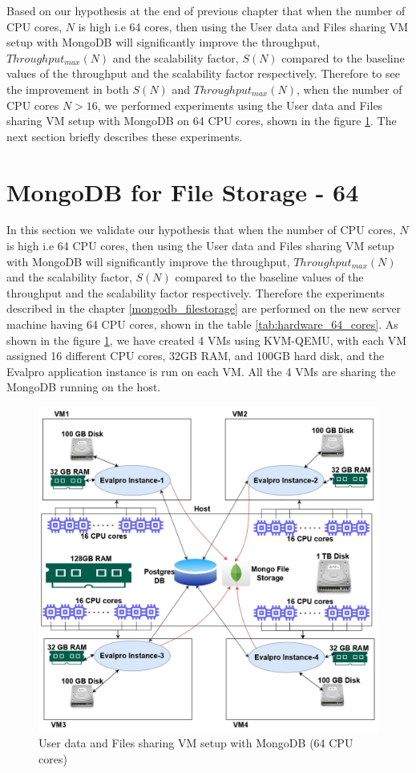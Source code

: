 \documentclass{iitbreport}
\begin{document}
Based on our hypothesis at the end of previous chapter that when the number of CPU cores, $N$ is high i.e 64 cores, then using the User data and Files sharing VM setup with MongoDB will significantly improve the throughput, $Throughput_{max}(N)$ and the scalability factor, $S(N)$ compared to the baseline values of the throughput and the scalability factor respectively. Therefore to see the improvement in both  $S(N)$ and $Throughput_{max}(N)$, when the number of CPU cores $N>16$, we performed experiments using the User data and Files sharing VM setup with MongoDB on 64 CPU cores, shown in the figure \ref{shared_vm_mongo_64_cores}. The next section briefly describes these experiments.

\section{MongoDB for File Storage - 64}\label{mongo_64_cores}
In this section we validate our hypothesis that when the number of CPU cores, $N$ is high i.e 64 CPU cores, then using the User data and Files sharing VM setup with MongoDB will significantly improve the throughput, $Throughput_{max}(N)$ and the scalability factor, $S(N)$ compared to the baseline values of the throughput and the scalability factor respectively. Therefore the experiments described in the chapter \ref{mongodb_filestorage} are performed on the new server machine having 64 CPU cores, shown in the table \ref{tab:hardware_64_cores}. As shown in the figure \ref{shared_vm_mongo_64_cores},  we have created 4 VMs using KVM-QEMU, with each VM assigned 16 different CPU cores, 32GB RAM, and 100GB hard disk, and the Evalpro application instance is run on each VM. All the 4 VMs are sharing the MongoDB running on the host.


\begin{figure}[!htb]
  \centering
  \includegraphics[width=\linewidth]{Images/shared_vm_mongo_64_cores.png}
  \caption{User data and Files sharing VM setup with  MongoDB (64 CPU cores)}
  \label{shared_vm_mongo_64_cores}
\end{figure}
\end{document}
